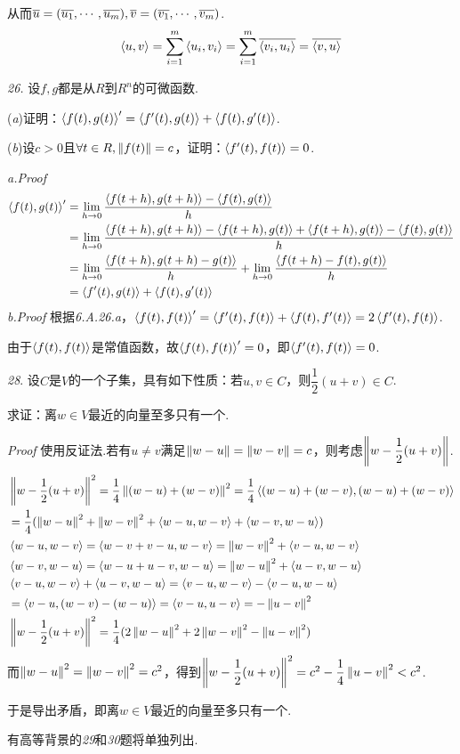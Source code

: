 从而\(\ol{u}=(\ol{u_1},\cdots,\ol{u_m}),\ol{v}=(\ol{v_1},\cdots,\ol{v_m})\).
    \begin{align*}
        \ip{u}{v}=\sum_{i=1}^m \ip{u_i}{v_i}=\sum_{i=1}^m \ol{\ip{v_i}{u_i}}=\ol{\ip{v}{u}}
    \end{align*}

\newpage

\textit{26.}
设\(f,g\)都是从\(R\)到\(R^n\)的可微函数.

(\textit{a})证明：\(\ip{f(t)}{g(t)}'=\ip{f'(t)}{g(t)}+\ip{f(t)}{g'(t)}\).

(\textit{b})设\(c>0\)且\(\forall t \in R,\norm{f(t)}=c\)，证明：\(\ip{f'(t)}{f(t)}=0\).

\textit{a.Proof}
    \begin{align*}
        \ip{f(t)}{g(t)}'&=\lim_{h \rightarrow 0}\dfrac{\ip{f(t+h)}{g(t+h)}-\ip{f(t)}{g(t)}}{h} \\
        &=\lim_{h \rightarrow 0}\dfrac{\ip{f(t+h)}{g(t+h)}-\ip{f(t+h)}{g(t)}+\ip{f(t+h)}{g(t)}-\ip{f(t)}{g(t)}}{h} \\
        &=\lim_{h \rightarrow 0}\dfrac{\ip{f(t+h)}{g(t+h)-g(t)}}{h}+\lim_{h \rightarrow 0}\dfrac{\ip{f(t+h)-f(t)}{g(t)}}{h} \\
        &=\ip{f'(t)}{g(t)}+\ip{f(t)}{g'(t)}
    \end{align*}
\textit{b.Proof}
根据\textit{6.A.26.a}，\(\ip{f(t)}{f(t)}'=\ip{f'(t)}{f(t)}+\ip{f(t)}{f'(t)}=2\ip{f'(t)}{f(t)}\).

由于\(\ip{f(t)}{f(t)}\)是常值函数，故\(\ip{f(t)}{f(t)}'=0\)，即\(\ip{f'(t)}{f(t)}=0\).

\hspace*{\fill}

\textit{28}.
设\(C\)是\(V\)的一个子集，具有如下性质：若\(u,v \in C\)，则\(\dfrac{1}{2}(u+v) \in C\).

求证：离\(w \in V\)最近的向量至多只有一个.

\textit{Proof}
使用反证法.若有\(u \ne v\)满足\(\norm{w-u}=\norm{w-v}=c\)，则考虑\(\norm{w-\dfrac{1}{2}(u+v)}\).
    \begin{align*}
        &\norm{w-\dfrac{1}{2}(u+v)}^2=\dfrac{1}{4}\norm{(w-u)+(w-v)}^2=\dfrac{1}{4}\ip{(w-u)+(w-v)}{(w-u)+(w-v)} \\
        &=\dfrac{1}{4}(\norm{w-u}^2+\norm{w-v}^2+\ip{w-u}{w-v}+\ip{w-v}{w-u}) \\
        &\ip{w-u}{w-v}=\ip{w-v+v-u}{w-v}=\norm{w-v}^2+\ip{v-u}{w-v} \\
        &\ip{w-v}{w-u}=\ip{w-u+u-v}{w-u}=\norm{w-u}^2+\ip{u-v}{w-u} \\
        &\ip{v-u}{w-v}+\ip{u-v}{w-u}=\ip{v-u}{w-v}-\ip{v-u}{w-u} \\
        &=\ip{v-u}{(w-v)-(w-u)}=\ip{v-u}{u-v}=-\norm{u-v}^2 \\
        &\norm{w-\dfrac{1}{2}(u+v)}^2=\dfrac{1}{4}(2\norm{w-u}^2+2\norm{w-v}^2-\norm{u-v}^2)
    \end{align*}
而\(\norm{w-u}^2=\norm{w-v}^2=c^2\)，得到\(\norm{w-\dfrac{1}{2}(u+v)}^2=c^2-\dfrac{1}{4}\norm{u-v}^2<c^2\).

于是导出矛盾，即离\(w \in V\)最近的向量至多只有一个.

\hspace*{\fill}

有高等背景的\textit{29}和\textit{30}题将单独列出.

